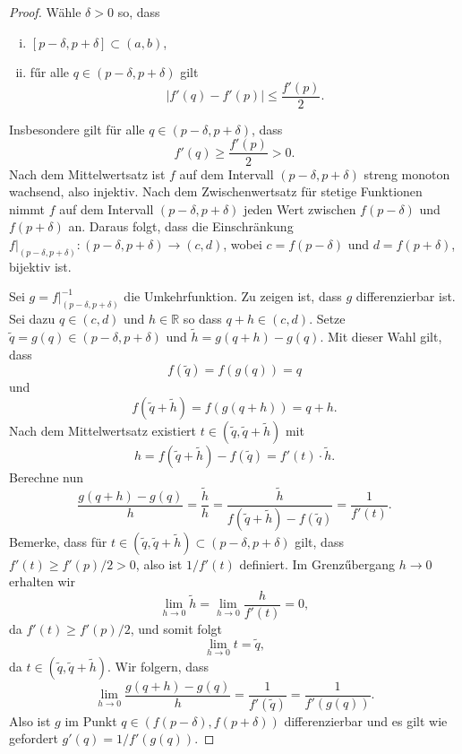 \documentclass[../main.tex]{subfiles}
\begin{document}
\begin{proof}
  Wähle $\delta > 0$ so, dass
  \begin{enumerate}[(i)]
    \item $[p - \delta, p + \delta] \subset (a,b)$,
    \item fűr alle $q \in (p - \delta, p + \delta)$ gilt
      \[
        |f'(q) - f'(p)| \leq \frac{f'(p)}{2}.
      \]
  \end{enumerate}
  Insbesondere gilt für alle $q \in (p - \delta, p + \delta)$, dass
  \[
    f'(q) \geq \frac{f'(p)}{2} > 0.
  \]
  Nach dem Mittelwertsatz ist $f$ auf dem
  Intervall $(p -\delta, p+\delta)$ streng
  monoton wachsend, also injektiv.
  Nach dem Zwischenwertsatz für stetige Funktionen
  nimmt $f$ auf dem Intervall $(p - \delta, p + \delta)$
  jeden Wert zwischen $f(p - \delta)$ und $f(p + \delta)$ an.
  Daraus folgt, dass die Einschränkung
  $f|_{(p - \delta, p + \delta)} \colon (p - \delta, p + \delta) \to (c, d)$,
  wobei
  $c = f(p - \delta)$ und $d = f(p + \delta)$,
  bijektiv ist.

  Sei $g = f|_{(p - \delta, p + \delta)}^{-1}$ die
  Umkehrfunktion.
  Zu zeigen ist, dass $g$ differenzierbar ist.
  Sei dazu $q \in (c, d)$ und $h \in \mathbb{R}$ so dass
  $q + h \in (c, d)$.
  Setze $\tilde q = g(q) \in (p - \delta, p +\delta)$ und
  $\tilde h = g(q + h) - g(q)$.
  Mit dieser Wahl gilt, dass
  \[
    f(\tilde q) = f(g(q)) = q
  \]
  und
  \[
    f(\tilde q + \tilde h) = f(g(q + h)) = q + h.
  \]
  Nach dem Mittelwertsatz existiert $t \in (\tilde q, \tilde q + \tilde h)$
  mit
  \[
    h = f(\tilde q + \tilde h) - f(\tilde q) = f'(t) \cdot \tilde h.
  \]
  Berechne nun
  \[
    \frac{g(q + h) - g(q)}{h} = \frac{\tilde h}{h} =
    \frac{\tilde h}{f(\tilde q + \tilde h) - f(\tilde q) } =
    \frac{1}{f'(t)}.
  \]
  Bemerke, dass für $t \in (\tilde q, \tilde q + \tilde h) \subset (p - \delta, p + \delta)$
  gilt, dass
  $f'(t) \geq f'(p) / 2 > 0$, also ist $1/f'(t)$ definiert.
  Im Grenzűbergang $h \to 0$ erhalten wir
  \[
    \lim_{h \to 0} \tilde h = \lim_{h \to 0} \frac{h}{f'(t)} = 0,
  \]
  da $f'(t) \geq f'(p) / 2$, und somit folgt
  \[
    \lim_{h \to 0} t = \tilde q,
  \]
  da $t \in (\tilde q, \tilde q + \tilde h)$. Wir folgern,
  dass
  \[
    \lim_{h \to 0} \frac{g(q + h) - g(q)}{h} = \frac{1}{f'(\tilde q)} = \frac{1}{f'(g(q))}.
  \]
  Also ist $g$ im Punkt $q \in (f(p - \delta), f(p + \delta))$ differenzierbar
  und es gilt wie gefordert $g'(q) = 1 / f'(g(q))$.
\end{proof}
\end{document}
